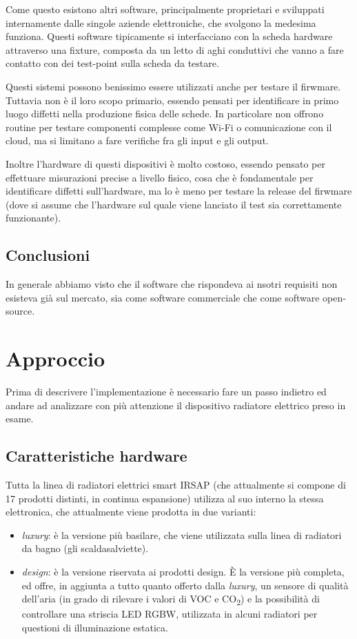 \documentclass[12pt,a4paper,twoside,titlepage]{book}
\begin{document}
Come questo esistono altri software, principalmente proprietari e sviluppati internamente dalle singole 
aziende elettroniche, che svolgono la medesima funziona. Questi software tipicamente si interfacciano 
con la scheda hardware attraverso una fixture, composta da un letto di aghi conduttivi che vanno a 
fare contatto con dei test-point sulla scheda da testare. 

Questi sistemi possono benissimo essere utilizzati anche per testare il firwmare. Tuttavia non è 
il loro scopo primario, essendo pensati per identificare in primo luogo diffetti nella produzione 
fisica delle schede. In particolare non offrono routine per testare componenti complesse come Wi-Fi o comunicazione con il 
cloud, ma si limitano a fare verifiche fra gli input e gli output. 

Inoltre l'hardware di questi dispositivi è molto costoso, essendo pensato per effettuare misurazioni 
precise a livello fisico, cosa che è fondamentale per identificare diffetti sull'hardware, ma lo è 
meno per testare la release del firwmare (dove si assume che l'hardware sul quale viene lanciato il test 
sia correttamente funzionante). 

\section{Conclusioni}

In generale abbiamo visto che il software che rispondeva ai nsotri requisiti non esisteva già sul mercato, 
sia come software commerciale che come software open-source. 

\chapter{Approccio}

Prima di descrivere l'implementazione è necessario fare un passo indietro ed andare 
ad analizzare con più attenzione il dispositivo radiatore elettrico preso in esame. 

\section{Caratteristiche hardware}

Tutta la linea di radiatori elettrici smart IRSAP (che attualmente si compone di 17 prodotti distinti,
in continua espansione) utilizza al suo interno la stessa elettronica, che attualmente viene 
prodotta in due varianti:

\begin{itemize}
    \item \textit{luxury}: è la versione più basilare, che viene utilizzata sulla linea di 
        radiatori da bagno (gli scaldasalviette). 
    \item \textit{design}: è la versione riservata ai prodotti design. È la versione più completa, 
        ed offre, in aggiunta a tutto quanto offerto dalla \textit{luxury}, un sensore di qualità
        dell'aria (in grado di rilevare i valori di VOC e CO\textsubscript{2}) e la possibilità di
        controllare una striscia LED RGBW, utilizzata in alcuni radiatori per questioni
        di illuminazione estatica.
\end{itemize}
\end{document}
